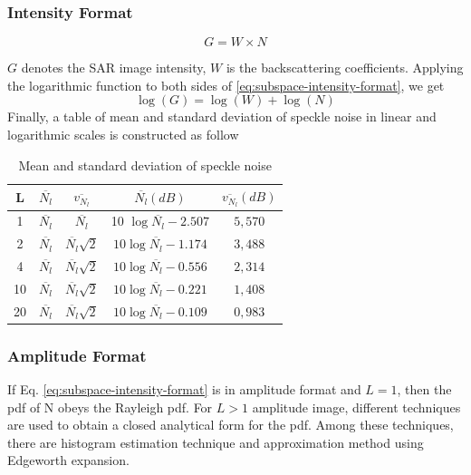 \subsubsection*{Intensity Format}
\begin{equation}
	G = W\times N
    \label{eq:subspace-intensity-format}
\end{equation}

$G$ denotes the SAR image intensity, $W$ is the backscattering coefficients. Applying the logarithmic function to both sides of \ref{eq:subspace-intensity-format}, we get
\begin{equation}
	\log(G)=\log(W)+\log(N)
\end{equation}
Finally, a table of mean and standard deviation of speckle noise in linear and logarithmic scales is constructed as follow
\begin{table}
\centering
\caption{Mean and standard deviation of speckle noise}
\begin{tabular}{|c|c|c|c|c|}
\hline
\textbf{L} & \textbf{$\overline{N_{l}}$} & \textbf{$\overline{v_{N_{l}}}$}  &  \textbf{$\overline{N_{l}}(dB)$} & \textbf{$\overline{v_{N_{l}}}(dB)$} \\ \hline
1  & $\overline{N_{l}}$ & $\overline{N_{l}}$ & 10 $\log\overline{N_{l}} -2.507$ & $5,570$ \\ \hline
2  & $\overline{N_{l}}$ & $\overline{N_{l}}\sqrt{2}$ & $10 \log \overline{N_{l}} -1.174$ & $3,488$ \\ \hline
4  & $\overline{N_{l}}$ & $\overline{N_{l}}\sqrt{2}$ & $10 \log \overline{N_{l}} -0.556$ & $2,314$ \\ \hline
10 & $\overline{N_{l}}$ & $\overline{N_{l}}\sqrt{2}$ & $10 \log \overline{N_{l}} -0.221$ & $1,408$ \\ \hline
20 & $\overline{N_{l}}$ & $\overline{N_{l}}\sqrt{2}$ & $10 \log \overline{N_{l}} -0.109 $ & $0,983$ \\ \hline
\end{tabular}
\label{tab:subspace-mean-deviation-speckle-noise}
\end{table}

\subsubsection*{Amplitude Format}
If Eq. \ref{eq:subspace-intensity-format} is in amplitude format and $L = 1$, then the pdf of N obeys the Rayleigh pdf. For
$L > 1$ amplitude image, different techniques are used to obtain a closed analytical
form for the pdf. Among these techniques, there are histogram estimation technique
and approximation method using Edgeworth expansion.

